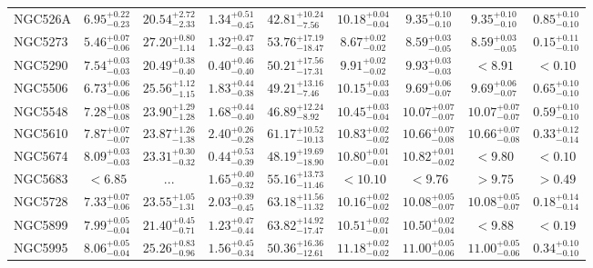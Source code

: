 \documentclass[onecolumn]{mn2e}
\begin{document}
{\begin{center}
\begin{longtable}{lcccccccc}
NGC526A & $6.95_{-0.23}^{+0.22}$ & $20.54_{-2.33}^{+2.72}$ & $1.34_{-0.45}^{+0.51}$ &$42.81_{-7.56}^{+10.24}$ & $10.18_{-0.04}^{+0.04}$ & $9.35_{-0.10}^{+0.10}$ & $9.35_{-0.10}^{+0.10}$ & $0.85_{-0.10}^{+0.10}$ \\
NGC5273 & $5.46_{-0.06}^{+0.07}$ & $27.20_{-1.14}^{+0.80}$ & $1.32_{-0.43}^{+0.47}$ &$53.76_{-18.47}^{+17.19}$ & $8.67_{-0.02}^{+0.02}$ & $8.59_{-0.05}^{+0.03}$ & $8.59_{-0.05}^{+0.03}$ & $0.15_{-0.10}^{+0.11}$ \\
NGC5290 & $7.54_{-0.03}^{+0.03}$ & $20.49_{-0.40}^{+0.38}$ & $0.40_{-0.40}^{+0.46}$ &$50.21_{-17.31}^{+17.56}$ & $9.91_{-0.02}^{+0.02}$ & $9.93_{-0.03}^{+0.03}$ & $<8.91$ & $<0.10$ \\
NGC5506 & $6.73_{-0.06}^{+0.06}$ & $25.56_{-1.15}^{+1.12}$ & $1.83_{-0.38}^{+0.44}$ &$49.21_{-7.46}^{+13.16}$ & $10.15_{-0.03}^{+0.03}$ & $9.69_{-0.07}^{+0.06}$ & $9.69_{-0.07}^{+0.06}$ & $0.65_{-0.10}^{+0.10}$ \\
NGC5548 & $7.28_{-0.08}^{+0.08}$ & $23.90_{-1.28}^{+1.29}$ & $1.68_{-0.40}^{+0.44}$ &$46.89_{-8.92}^{+12.24}$ & $10.45_{-0.04}^{+0.03}$ & $10.07_{-0.07}^{+0.07}$ & $10.07_{-0.07}^{+0.07}$ & $0.59_{-0.10}^{+0.10}$ \\
NGC5610 & $7.87_{-0.07}^{+0.07}$ & $23.87_{-1.38}^{+1.26}$ & $2.40_{-0.28}^{+0.26}$ &$61.17_{-10.13}^{+10.52}$ & $10.83_{-0.02}^{+0.02}$ & $10.66_{-0.08}^{+0.07}$ & $10.66_{-0.08}^{+0.07}$ & $0.33_{-0.14}^{+0.12}$ \\
NGC5674 & $8.09_{-0.03}^{+0.03}$ & $23.31_{-0.32}^{+0.30}$ & $0.44_{-0.39}^{+0.53}$ &$48.19_{-18.90}^{+19.69}$ & $10.80_{-0.01}^{+0.01}$ & $10.82_{-0.02}^{+0.01}$ & $<9.80$ & $<0.10$ \\
NGC5683 & $<6.85$ & ... & $1.65_{-0.32}^{+0.40}$ &$55.16_{-11.46}^{+13.73}$ & $<10.10$ & $<9.76$ & $>9.75$ & $>0.49$ \\
NGC5728 & $7.33_{-0.06}^{+0.07}$ & $23.55_{-1.31}^{+1.05}$ & $2.03_{-0.45}^{+0.39}$ &$63.18_{-11.32}^{+11.56}$ & $10.16_{-0.02}^{+0.02}$ & $10.08_{-0.07}^{+0.05}$ & $10.08_{-0.07}^{+0.05}$ & $0.18_{-0.14}^{+0.14}$ \\
NGC5899 & $7.99_{-0.04}^{+0.05}$ & $21.40_{-0.71}^{+0.45}$ & $1.23_{-0.44}^{+0.47}$ &$63.82_{-17.47}^{+14.92}$ & $10.51_{-0.01}^{+0.02}$ & $10.50_{-0.04}^{+0.02}$ & $<9.88$ & $<0.19$ \\
NGC5995 & $8.06_{-0.04}^{+0.05}$ & $25.26_{-0.96}^{+0.83}$ & $1.56_{-0.34}^{+0.45}$ &$50.36_{-12.61}^{+16.36}$ & $11.18_{-0.02}^{+0.02}$ & $11.00_{-0.06}^{+0.05}$ & $11.00_{-0.06}^{+0.05}$ & $0.34_{-0.10}^{+0.10}$ \\

\end{longtable}
\end{center}}
\end{document}
